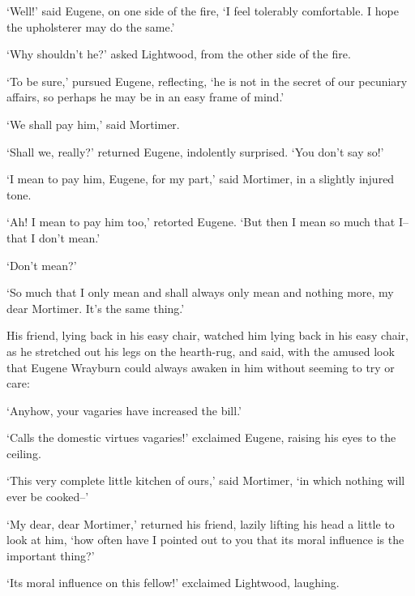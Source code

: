 ‘Well!’ said Eugene, on one side of the fire, ‘I feel tolerably
comfortable. I hope the upholsterer may do the same.’

‘Why shouldn’t he?’ asked Lightwood, from the other side of the fire.

‘To be sure,’ pursued Eugene, reflecting, ‘he is not in the secret of
our pecuniary affairs, so perhaps he may be in an easy frame of mind.’

‘We shall pay him,’ said Mortimer.

‘Shall we, really?’ returned Eugene, indolently surprised. ‘You don’t
say so!’

‘I mean to pay him, Eugene, for my part,’ said Mortimer, in a slightly
injured tone.

‘Ah! I mean to pay him too,’ retorted Eugene. ‘But then I mean so much
that I--that I don’t mean.’

‘Don’t mean?’

‘So much that I only mean and shall always only mean and nothing more,
my dear Mortimer. It’s the same thing.’

His friend, lying back in his easy chair, watched him lying back in his
easy chair, as he stretched out his legs on the hearth-rug, and said,
with the amused look that Eugene Wrayburn could always awaken in him
without seeming to try or care:

‘Anyhow, your vagaries have increased the bill.’

‘Calls the domestic virtues vagaries!’ exclaimed Eugene, raising his
eyes to the ceiling.

‘This very complete little kitchen of ours,’ said Mortimer, ‘in which
nothing will ever be cooked--’

‘My dear, dear Mortimer,’ returned his friend, lazily lifting his head
a little to look at him, ‘how often have I pointed out to you that its
moral influence is the important thing?’

‘Its moral influence on this fellow!’ exclaimed Lightwood, laughing.

